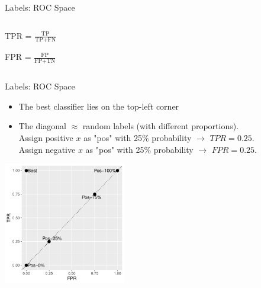 \documentclass[11pt,compress,t,notes=noshow, xcolor=table]{beamer}
\newenvironment{knitrout}{}{} %
\begin{document}
\begin{vbframe}{Labels: ROC Space}
\begin{columns}
\begin{column}{0.5\textwidth}
\begin{center}
\lz\lz

TPR = $\frac{\text{TP}}{\text{TP} + \text{FN}}$

\lz

FPR = $\frac{\text{FP}}{\text{FP} + \text{TN}}$
\end{center}


\end{column}
\end{columns}

\end{vbframe}


\begin{vbframe}{Labels: ROC Space}
  \begin{itemize}
  \item The best classifier lies on the top-left corner
  \item The diagonal $\approx$ random labels (with different proportions).\\ 
  Assign positive $x$ as "pos" with 25\% probability $\rightarrow$ $TPR = 0.25$.\\ 
  Assign negative $x$ as "pos" with 25\% probability $\rightarrow$ $FPR = 0.25$.
\end{itemize}

\lz
\begin{knitrout}\scriptsize
{}\color{fgcolor}

{\centering \includegraphics[width=0.4\textwidth]{figure/eval_mclass_roc_sp_2} 

}



\end{knitrout}
\end{vbframe}
\end{document}
